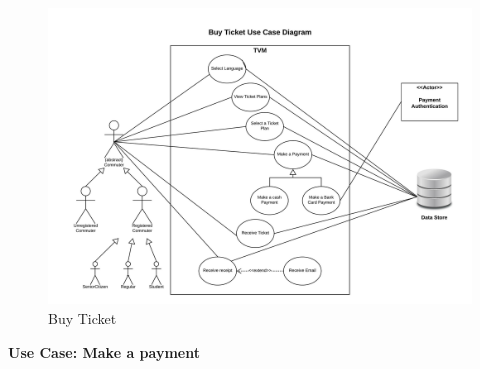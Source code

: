 \documentclass[a4paper,12pt]{report}
\begin{document}
\begin{figure}[!htb]
	\includegraphics[width=1\textwidth]{Use_Case_Diagrams/BuyTicket.jpeg}
	\caption{\label{fig:Use Case Model : } Buy Ticket}	
\end{figure}


\vspace{0.5cm}
\textbf{\large Use Case: Make a payment}
\\
\end{document}
